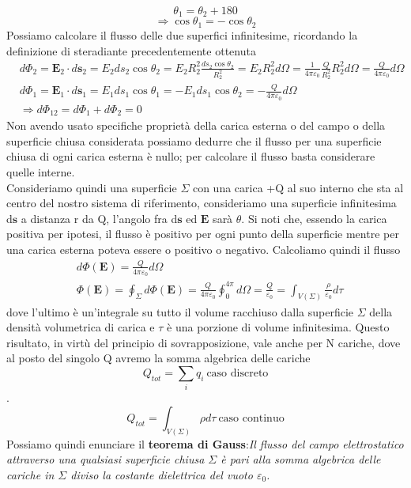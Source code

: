 \documentclass[
10pt, %
a4paper, %
oneside, %
headinclude,footinclude, %
BCOR5mm, %
]{scrartcl}
\begin{document}
\[\theta_1 = \theta_2 + 180\]
\[\Rightarrow \cos\theta_1 = -\cos\theta_2\]
Possiamo calcolare il flusso delle due superfici infinitesime, ricordando la definizione di steradiante precedentemente ottenuta
\begin{align*}
	&d\Phi_2 = \mathbf{E}_2\cdot d\mathbf{s}_2 = E_2 ds_2 \cos\theta_2 = E_2 R_2^2 \frac{ ds_2 \cos\theta_2}{R_2^2} = E_2 R_2^2 d\Omega =\frac{1}{4\pi\varepsilon_0}\frac{Q}{R^2_2}R^2_2 d\Omega= \frac{Q}{4\pi\varepsilon_0}d\Omega \\
	&d\Phi_1 = \mathbf{E}_1\cdot d\mathbf{s}_1 = E_1 ds_1 \cos\theta_1 = -E_1 ds_1 \cos\theta_2 = -\frac{Q}{4\pi\varepsilon_0}d\Omega\\
	&\Rightarrow d\Phi_{12} = d\Phi_1 + d\Phi_2 = 0
\end{align*}
Non avendo usato specifiche proprietà della carica esterna o del campo o della superficie chiusa considerata possiamo dedurre che il flusso per una superficie chiusa di ogni carica esterna è nullo; per calcolare il flusso basta considerare quelle interne.\\
Consideriamo quindi una superficie \(\Sigma\) con una carica +Q al suo interno che sta al centro del nostro sistema di riferimento, consideriamo una superficie infinitesima d$\mathbf{s}$ a distanza r da Q, l'angolo fra d$\mathbf{s}$ ed $\mathbf{E}$ sarà $\theta$. Si noti che, essendo la carica positiva per ipotesi, il flusso è positivo per ogni punto della superficie mentre per una carica esterna poteva essere o positivo o negativo. Calcoliamo quindi il flusso
\begin{align*}
	&d\Phi(\mathbf{E}) = \frac{Q}{4\pi\varepsilon_0}d\Omega\\
	&\Phi(\mathbf{E}) = \oint_{\Sigma} d\Phi(\mathbf{E}) = \frac{Q}{4\pi\varepsilon_0}\oint_0^{4\pi}d\Omega = \frac{Q}{\varepsilon_0} = \int_{V(\Sigma)}\frac{\rho}{\varepsilon_0}d\tau
	\end{align*}
dove l'ultimo è un'integrale su tutto il volume racchiuso dalla superficie $\Sigma$ della densità volumetrica di carica e $\tau$ è una porzione di volume infinitesima. Questo risultato, in virtù del principio di sovrapposizione, vale anche per N cariche, dove al posto del singolo Q avremo la somma algebrica delle cariche 
\[Q_{tot} = \sum_iq_i\ \text{caso discreto}\]. 
\[Q_{tot} = \int_{V(\Sigma)}\rho d\tau\ \text{caso continuo}\]
Possiamo quindi enunciare il \textbf{teorema di Gauss}:\textit{Il flusso del campo elettrostatico attraverso una qualsiasi superficie chiusa $\Sigma$ è pari alla somma algebrica delle cariche in \(\Sigma\) diviso la costante dielettrica del vuoto $\varepsilon_0$.}
\end{document}
